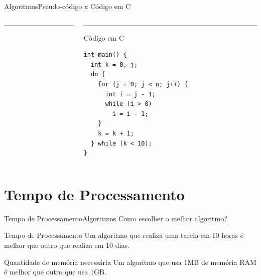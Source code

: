 \documentclass[aspectratio=169]{beamer}
\begin{document}

\begin{frame}[fragile]{Algoritmos}{Pseudo-código x Código em C}
\begin{columns}[T] %
\begin{column}{.48\textwidth}
\color{red}\rule{\linewidth}{4pt}
\begin{algorithm}[H]
\caption{Pseudo-código} 
\label{pseudocodigo}
\end{algorithm}
\end{column}%
\hfill%
\begin{column}{.48\textwidth}
\color{blue}\rule{\linewidth}{4pt}
Código em C
\begin{lstlisting}
int main() {
  int k = 0, j;
  do {
    for (j = 0; j < n; j++) {
      int i = j - 1;
      while (i > 0) 
        i = i - 1;
    }
    k = k + 1;
  } while (k < 10);
}
\end{lstlisting}
\end{column}%
\end{columns}
\end{frame}

\section{Tempo de Processamento}

\begin{frame}{Tempo de Processamento}{Algoritmos}
Como escolher o melhor algoritmo?
\begin{block}{Tempo de Processamento}
Um algoritmo que realiza uma tarefa em 10 horas é melhor que outro que realiza em 10 dias.
\end{block}
\begin{block}{Quantidade de memória necessária}
Um algoritmo que usa 1MB de memória RAM é melhor que outro que usa 1GB.
\end{block}
\end{frame}
\end{document}
